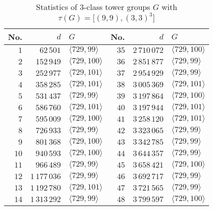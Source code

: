 \documentclass{amsart}
\theoremstyle{definition}
\numberwithin{equation}{section}
\begin{document}
\begin{table}[ht]
\caption{Statistics of \(3\)-class tower groups \(G\) with \(\tau(G)=\lbrack (9,9),(3,3)^3\rbrack\)}
\label{tbl:Statistics}
\begin{center}
\begin{tabular}{|r|r|l||r|r|l|}
\hline
    No. &           \(d\) & \(G\)                      &    No. &           \(d\) & \(G\)                      \\
\hline
  \(1\) &     \(62\,501\) & \(\langle 729,99\rangle\)  & \(35\) & \(2\,710\,072\) & \(\langle 729,100\rangle\) \\
  \(2\) &    \(152\,949\) & \(\langle 729,100\rangle\) & \(36\) & \(2\,851\,877\) & \(\langle 729,99\rangle\)  \\
  \(3\) &    \(252\,977\) & \(\langle 729,101\rangle\) & \(37\) & \(2\,954\,929\) & \(\langle 729,99\rangle\)  \\
  \(4\) &    \(358\,285\) & \(\langle 729,101\rangle\) & \(38\) & \(3\,005\,369\) & \(\langle 729,101\rangle\) \\
  \(5\) &    \(531\,437\) & \(\langle 729,99\rangle\)  & \(39\) & \(3\,197\,864\) & \(\langle 729,100\rangle\) \\
  \(6\) &    \(586\,760\) & \(\langle 729,101\rangle\) & \(40\) & \(3\,197\,944\) & \(\langle 729,101\rangle\) \\
  \(7\) &    \(595\,009\) & \(\langle 729,100\rangle\) & \(41\) & \(3\,258\,120\) & \(\langle 729,101\rangle\) \\
  \(8\) &    \(726\,933\) & \(\langle 729,99\rangle\)  & \(42\) & \(3\,323\,065\) & \(\langle 729,99\rangle\)  \\
  \(9\) &    \(801\,368\) & \(\langle 729,100\rangle\) & \(43\) & \(3\,342\,785\) & \(\langle 729,99\rangle\)  \\
 \(10\) &    \(940\,593\) & \(\langle 729,100\rangle\) & \(44\) & \(3\,644\,357\) & \(\langle 729,99\rangle\)  \\
 \(11\) &    \(966\,489\) & \(\langle 729,99\rangle\)  & \(45\) & \(3\,658\,421\) & \(\langle 729,100\rangle\) \\
 \(12\) & \(1\,177\,036\) & \(\langle 729,99\rangle\)  & \(46\) & \(3\,692\,717\) & \(\langle 729,99\rangle\)  \\
 \(13\) & \(1\,192\,780\) & \(\langle 729,101\rangle\) & \(47\) & \(3\,721\,565\) & \(\langle 729,99\rangle\)  \\
 \(14\) & \(1\,313\,292\) & \(\langle 729,99\rangle\)  & \(48\) & \(3\,799\,597\) & \(\langle 729,100\rangle\) \\

\end{tabular}
\end{center}
\end{table}
\end{document}
